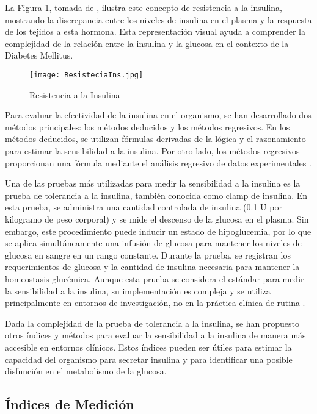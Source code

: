 La Figura \ref{fig:Resistencia}, tomada de \cite{ImgResis}, ilustra este concepto de resistencia a la insulina, mostrando la discrepancia entre los niveles de insulina en el plasma y la respuesta de los tejidos a esta hormona. Esta representación visual ayuda a comprender la complejidad de la relación entre la insulina y la glucosa en el contexto de la Diabetes Mellitus.

\begin{figure}[H]
    \centering
    \texttt{[image: ResisteciaIns.jpg]}
    \caption{Resistencia a la Insulina}
    \label{fig:Resistencia}
\end{figure}

Para evaluar la efectividad de la insulina en el organismo, se han desarrollado dos métodos principales: los métodos deducidos y los métodos regresivos. En los métodos deducidos, se utilizan fórmulas derivadas de la lógica y el razonamiento para estimar la sensibilidad a la insulina. Por otro lado, los métodos regresivos proporcionan una fórmula mediante el análisis regresivo de datos experimentales \cite{MedicionEstimacion}.

Una de las pruebas más utilizadas para medir la sensibilidad a la insulina es la prueba de tolerancia a la insulina, también conocida como clamp de insulina. En esta prueba, se administra una cantidad controlada de insulina (0.1 U por kilogramo de peso corporal) y se mide el descenso de la glucosa en el plasma. Sin embargo, este procedimiento puede inducir un estado de hipoglucemia, por lo que se aplica simultáneamente una infusión de glucosa para mantener los niveles de glucosa en sangre en un rango constante. Durante la prueba, se registran los requerimientos de glucosa y la cantidad de insulina necesaria para mantener la homeostasis glucémica. Aunque esta prueba se considera el estándar para medir la sensibilidad a la insulina, su implementación es compleja y se utiliza principalmente en entornos de investigación, no en la práctica clínica de rutina \cite{MedicionEstimacion}.

Dada la complejidad de la prueba de tolerancia a la insulina, se han propuesto otros índices y métodos para evaluar la sensibilidad a la insulina de manera más accesible en entornos clínicos. Estos índices pueden ser útiles para estimar la capacidad del organismo para secretar insulina y para identificar una posible disfunción en el metabolismo de la glucosa.

\subsection{Índices de Medición}

